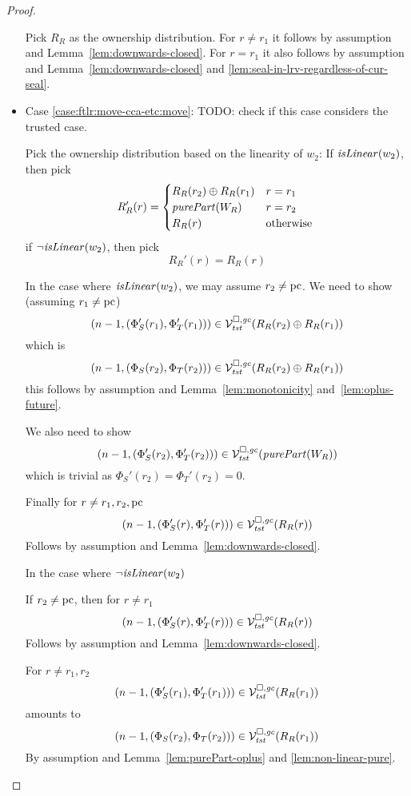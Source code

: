 \begin{proof}
\begin{itemize}
    Pick $R_R$ as the ownership distribution.
    For $r \neq r_1$ it follows by assumption and Lemma~\ref{lem:downwards-closed}.
    For $r = r_1$ it also follows by assumption and Lemma~\ref{lem:downwards-closed} and \ref{lem:seal-in-lrv-regardless-of-cur-seal}.

  \item Case \ref{case:ftlr:move-cca-etc:move}:
    TODO: check if this case considers the trusted case.

    Pick the ownership distribution based on the linearity of $w_2$: If $\isLinear{w_2}$, then pick
    \[
      R_R'(r) =
      \begin{cases}
        R_R(r_2) \oplus R_R(r_1) & r = r_1 \\
        \purePart{W_R}         & r = r_2 \\
        R_R(r)                 & \totherwise
      \end{cases}
    \]
    if $\neg \isLinear{w_2}$, then pick
    \[
      R_R'(r) = R_R(r)
    \]

    In the case where $\isLinear{w_2}$, we may assume $r_2 \neq \pcreg$. We need to show (assuming $r_1 \neq \pcreg$)
    \[
      \npair[n-1]{(\Phi_S'(r_1),\Phi_T'(r_1))} \in \lrvg{\trust}(R_R(r_2) \oplus R_R(r_1))
    \]
    which is 
    \[
      \npair[n-1]{(\Phi_S(r_2),\Phi_T(r_2))} \in \lrvg{\trust}(R_R(r_2) \oplus R_R(r_1))
    \]
    this follows by assumption and Lemma~\ref{lem:monotonicity} and~\ref{lem:oplus-future}.

    We also need to show
    \[
      \npair[n-1]{(\Phi_S'(r_2),\Phi_T'(r_2))} \in \lrvg{\trust}(\purePart{W_R})
    \]
    which is trivial as $\Phi_S'(r_2) = \Phi_T'(r_2) = 0$. 

    Finally for $r \neq r_1,r_2,\pcreg$ 
    \[
      \npair[n-1]{(\Phi_S'(r),\Phi_T'(r))} \in \lrvg{\trust}(R_R(r))
    \]
    Follows by assumption and Lemma~\ref{lem:downwards-closed}.

    In the case where $\neg \isLinear{w_2}$

    If $r_2 \neq \pcreg$, then for $r \neq r_1$
    \[
      \npair[n-1]{(\Phi_S'(r),\Phi_T'(r))} \in \lrvg{\trust}(R_R(r))
    \]
    Follows by assumption and Lemma~\ref{lem:downwards-closed}.
    
    For $r \neq r_1,r_2$
    \[
      \npair[n-1]{(\Phi_S'(r_1),\Phi_T'(r_1))} \in \lrvg{\trust}(R_R(r_1))
    \]
    amounts to
    \[
      \npair[n-1]{(\Phi_S(r_2),\Phi_T(r_2))} \in \lrvg{\trust}(R_R(r_1))
    \]
    By assumption and Lemma~\ref{lem:purePart-oplus} and \ref{lem:non-linear-pure}.


\end{itemize}
\end{proof}
